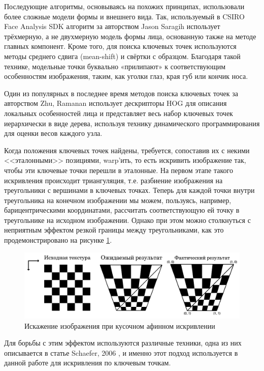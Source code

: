 Последующие алгоритмы, основываясь на похожих принципах, использовали более сложные модели формы и внешнего вида. Так, используемый в CSIRO Face Analysis SDK \cite{csiro} алгоритм за авторством Jason Saragih \cite{jsaragih} использует трёхмерную, а не двухмерную модель формы лица, основанную также на методе главных компонент. Кроме того, для поиска ключевых точек используются методы среднего сдвига (mean-shift) и свёртки с образцом. Благодаря такой технике, модельные точки буквально «прилипают» к соответствующим особенностям изображения, таким, как уголки глаз, края губ или кончик носа.

Один из популярных в последнее время методов поиска ключевых точек за авторством Zhu, Ramanan \cite{zhu_ramanan} использует дескрипторы HOG для описания локальных особенностей лица и представляет весь набор ключевых точек иерархически в виде дерева, используя технику динамического программирования для оценки весов каждого узла.

Когда положения ключевых точек найдены, требуется, сопоставив их с некими <<эталонными>> позициями, warp'ить, то есть искривить изображение так, чтобы эти ключевые точки перешли в эталонные. На первом этапе такого искривления происходит триангуляция, т.е. разбиение изображения на треугольники с вершинами в ключевых точках. Теперь для каждой точки внутри треугольника на конечном изображении мы можем, пользуясь, например, барицентрическими координатами, рассчитать соответствующую ей точку в треугольнике на исходном изображении. Однако при этом можно столкнуться с неприятным эффектом резкой границы между треугольниками, как это продемонстрировано на рисунке \ref{fig:affine}.

\begin{figure}[t]
	\centering
	\includegraphics[width=\textwidth]{affine.png}
	\caption{Искажение изображения при кусочном афинном искривлении}
	\label{fig:affine}
\end{figure}

Для борьбы с этим эффектом используются различные техники, одна из них описывается в статье Schaefer, 2006 \cite{warping}, и именно этот подход используется в данной работе для искривления по ключевым точкам.

